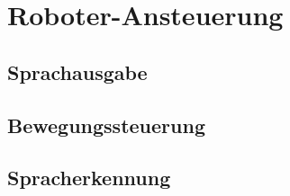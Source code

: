 \chapter{Roboter-Ansteuerung} %

\section{Sprachausgabe}


\section{Bewegungssteuerung} %


\section{Spracherkennung} %
